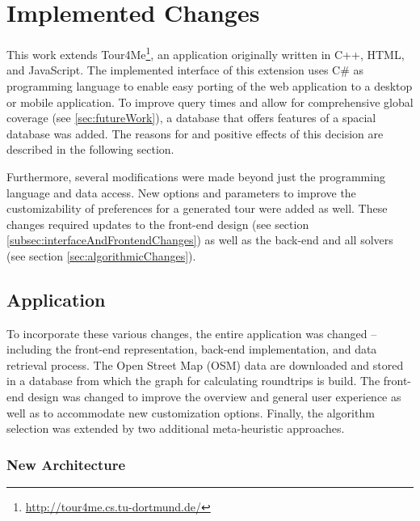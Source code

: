 \chapter{Implemented Changes}
\label{chapter:implementedChanges}

This work extends Tour4Me\footnote{\url{http://tour4me.cs.tu-dortmund.de/}}, an application originally written in C++, HTML, and JavaScript. 
The implemented interface of this extension uses C\# as programming language to enable easy porting of the web application to a desktop or mobile application.
To improve query times and allow for comprehensive global coverage (see \ref{sec:futureWork}), a database that offers features of a spacial database was added. 
The reasons for and positive effects of this decision are described in the following section.

Furthermore, several modifications were made beyond just the programming language and data access.
New options and parameters to improve the customizability of preferences for a generated tour were added as well.
These changes required updates to the front-end design (see section \ref{subsec:interfaceAndFrontendChanges}) as well as the back-end and all solvers (see section \ref{sec:algorithmicChanges}). 


\section{Application}
\label{sec:application}

To incorporate these various changes, the entire application was changed -- including the front-end representation, back-end implementation, and data retrieval process.
The Open Street Map (OSM) data are downloaded and stored in a database from which the graph for calculating roundtrips is build.
The front-end design was changed to improve the overview and general user experience as well as to accommodate new customization options.
Finally, the algorithm selection was extended by two additional meta-heuristic approaches.

\subsection{New Architecture}
\label{sec:newArchitecture}

